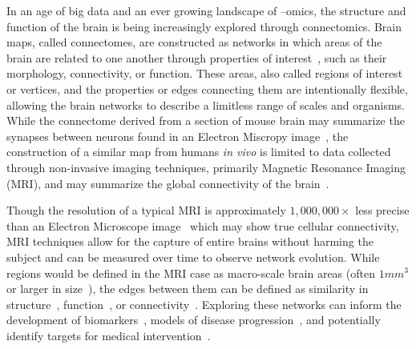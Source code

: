 In an age of big data and an ever growing landscape of –omics, the structure and function of the brain is being
increasingly explored through connectomics. Brain maps, called connectomes, are constructed as networks in which areas
of the brain are related to one another through properties of interest~\cite{fornito2015connectomics}, such as their
morphology, connectivity, or function. These areas, also called regions of interest or vertices, and the properties or
edges connecting them are intentionally flexible, allowing the brain networks to describe a limitless range of scales
and organisms. While the connectome derived from a section of mouse brain may summarize the synapses between neurons
found in an Electron Miscropy image~\cite{zingg2014neural}, the construction of a similar map from humans
\textit{in vivo} is limited to data collected through non-invasive imaging techniques, primarily Magnetic Resonance
Imaging (MRI), and may summarize the global connectivity of the
brain~\cite{sporns2013human,van2012future,hagmann2005diffusion}.

Though the resolution of a typical MRI is approximately $1,000,000 \times$ less precise than an Electron Microscope
image~\cite{kasthuri2015saturated} which may show true cellular connectivity, MRI techniques allow for the capture of
entire brains without harming the subject and can be measured over time to observe network evolution. While regions
would be defined in the MRI case as macro-scale brain areas (often $1mm^3$ or larger in
size~\cite{sotiropoulos2013advances}), the edges between them can be defined as similarity in
structure~\cite{zielinski2010network,alexander2013convergence,montembeault2012impact},
function~\cite{zuo2012network,cao2014topological,kelly2012characterizing}, or
connectivity~\cite{sporns2005human,ingalhalikar2014sex,sporns2013human}. Exploring these networks can inform the
development of biomarkers~\cite{alexander2013convergence,ingalhalikar2014sex}, models of disease
progression~\cite{shah2017altered,yan2018rich}, and potentially identify targets for medical
intervention~\cite{silasi2014stroke,iturria2017multifactorial}.

